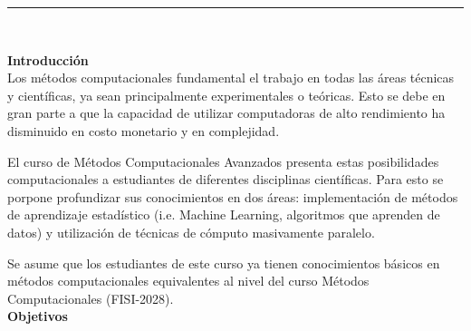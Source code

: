 \documentclass[letterpaper,10pt,onecolumn]{article}
\begin{document}





\noindent\rule{\textwidth}{1pt}\\[-0.1cm]

\addtocounter{mysection}{1}

\noindent\textbf{\large {} \quad Introducci\'on}\\[-0.2cm]


\noindent\normalsize Los m\'etodos computacionales fundamental el
trabajo en todas las \'areas t\'ecnicas y cient\'ificas,
ya sean principalmente experimentales o te\'oricas. Esto se debe en
gran parte a que la capacidad de utilizar computadoras de alto
rendimiento ha disminuido en costo monetario y en complejidad.

El curso de M\'etodos Computacionales Avanzados presenta estas
posibilidades computacionales a estudiantes de diferentes disciplinas
cient\'ificas. Para esto se porpone profundizar sus conocimientos
en dos \'areas: implementaci\'on de m\'etodos de aprendizaje estadístico (i.e. Machine Learning, algoritmos que aprenden de datos) y utilizaci\'on de t\'ecnicas de c\'omputo
masivamente paralelo.

Se asume que los estudiantes de este curso ya tienen conocimientos
b\'asicos en m\'etodos computacionales equivalentes al nivel del curso
M\'etodos Computacionales (FISI-2028). 
\\[0.1cm]

\noindent\textbf{\large {} \quad Objetivos}\\[-0.2cm]
\end{document}
